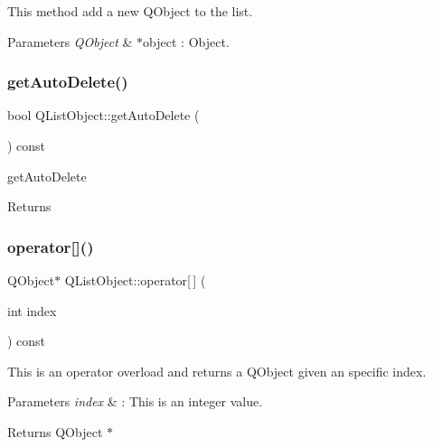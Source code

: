 This method add a new Q\+Object to the list. 


\begin{DoxyParams}{Parameters}
{\em Q\+Object} & $\ast$object \+: Object. \\
\hline
\end{DoxyParams}
\mbox{\label{class_q_list_object_ad9d1f7e3c9f2563bcded31b02edc06fb}} 
\subsubsection{\texorpdfstring{get\+Auto\+Delete()}{getAutoDelete()}}
{\footnotesize\ttfamily bool Q\+List\+Object\+::get\+Auto\+Delete (\begin{DoxyParamCaption}{ }\end{DoxyParamCaption}) const\hspace{0.3cm}{\ttfamily [inline]}}



get\+Auto\+Delete 

\begin{DoxyReturn}{Returns}

\end{DoxyReturn}
\mbox{\label{class_q_list_object_a9b87308d291c9699a36849e5d8bfedd4}} 
\subsubsection{\texorpdfstring{operator[]()}{operator[]()}}
{\footnotesize\ttfamily Q\+Object$\ast$ Q\+List\+Object\+::operator\mbox{[}$\,$\mbox{]} (\begin{DoxyParamCaption}\item[{int}]{index }\end{DoxyParamCaption}) const\hspace{0.3cm}{\ttfamily [inline]}}



This is an operator overload and returns a Q\+Object given an specific index. 


\begin{DoxyParams}{Parameters}
{\em index} & \+: This is an integer value. \\
\hline
\end{DoxyParams}
\begin{DoxyReturn}{Returns}
Q\+Object $\ast$ 
\end{DoxyReturn}
\mbox{\label{class_q_list_object_af6bc1883142f976bfd3e82c9d0c030bb}} 
